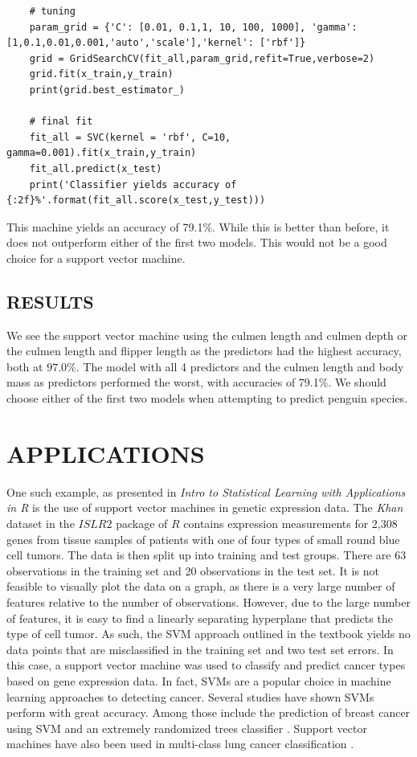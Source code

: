 \documentclass[12pt]{article}
\begin{document}
\begin{verbatim}
    # tuning
    param_grid = {'C': [0.01, 0.1,1, 10, 100, 1000], 'gamma': [1,0.1,0.01,0.001,'auto','scale'],'kernel': ['rbf']}
    grid = GridSearchCV(fit_all,param_grid,refit=True,verbose=2)
    grid.fit(x_train,y_train)
    print(grid.best_estimator_)

    # final fit
    fit_all = SVC(kernel = 'rbf', C=10, gamma=0.001).fit(x_train,y_train)
    fit_all.predict(x_test)
    print('Classifier yields accuracy of {:2f}%'.format(fit_all.score(x_test,y_test)))
\end{verbatim}

This machine yields an accuracy of 79.1\%. While this is better than before, it does not outperform either of the first two models. This would not be a good choice for a support vector machine.

\subsection{RESULTS}

We see the support vector machine using the culmen length and culmen depth or the culmen length and flipper length as the predictors had the highest accuracy, both at $97.0\%$. The model with all 4 predictors and the culmen length and body mass as predictors performed the worst, with accuracies of 79.1\%. We should choose either of the first two models when attempting to predict penguin species.

\section{APPLICATIONS}

One such example, as presented in \textit{Intro to Statistical Learning with Applications in R} \citep{introstatlearning} is the use of support vector machines in genetic expression data. The \textit{Khan} dataset in the $ISLR2$ package of $R$ contains expression measurements for 2,308 genes from tissue samples of patients with one of four types of small round blue cell tumors. The data is then split up into training and test groups. There are 63 observations in the training set and 20 observations in the test set. It is not feasible to visually plot the data on a graph, as there is a very large number of features relative to the number of observations. However, due to the large number of features, it is easy to find a linearly separating hyperplane that predicts the type of cell tumor. As such, the SVM approach outlined in the textbook yields no data points that are misclassified in the training set and two test set errors. In this case, a support vector machine was used to classify and predict cancer types based on gene expression data. In fact, SVMs are a popular choice in machine learning approaches to detecting cancer. Several studies have shown SVMs perform with great accuracy. Among those include the prediction of breast cancer using SVM and an extremely randomized trees classifier \cite{breastcancer}. Support vector machines have also been used in multi-class lung cancer classification \cite{lungcancer}.
\end{document}
